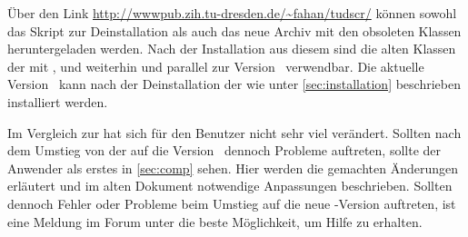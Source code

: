 \documentclass[%
  english,ngerman,%
  headings=optiontoheadandtoc,captions=tableheading,numbers=noenddot,%
  chapterpage,cdfoot,%
]{tudscrman}
\begin{document}
Über den Link \url{http://wwwpub.zih.tu-dresden.de/~fahan/tudscr/} können sowohl 
das Skript zur Deinstallation  als auch das 
neue Archiv mit den obsoleten Klassen 
heruntergeladen werden. Nach der Installation aus diesem sind die alten Klassen 
der \vTUD mit ,  und 
 weiterhin und parallel zur Version~\vTUDScript{} 
verwendbar. Die aktuelle Version~\vTUDScript{} kann nach der Deinstallation der 
\vTUD wie unter \autoref{sec:installation} beschrieben installiert werden.

Im Vergleich zur \vTUD hat sich für den Benutzer nicht sehr viel verändert. 
Sollten nach dem Umstieg von der \vTUD auf die Version~\vTUDScript{} dennoch 
Probleme auftreten, sollte der Anwender als erstes in \autoref{sec:comp} sehen. 
Hier werden die gemachten Änderungen erläutert und im alten Dokument notwendige 
Anpassungen beschrieben. Sollten dennoch Fehler oder Probleme beim Umstieg auf 
die neue \TUDScript-Version auftreten, ist eine Meldung im Forum unter \forum 
die beste Möglichkeit, um Hilfe zu erhalten.
\end{document}

